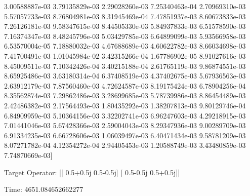 \documentclass{article}
\begin{document}
   3.00588887e-03   3.79135829e-03   2.29028260e-03   7.25340463e-04
   2.70969310e-03   5.57057733e-03   8.76804981e-03   8.31945469e-04
   7.47851937e-03   8.60673833e-03   7.26126181e-03   9.58347615e-03
   8.44505330e-03   5.84937833e-03   6.51578590e-03   7.16374347e-03
   8.48245796e-03   5.03429785e-03   6.64899099e-03   5.93566958e-03
   6.53570004e-05   7.18880032e-03   4.67688689e-03   4.60622782e-03
   8.66034698e-03   7.41700491e-03   1.01045984e-02   3.42315266e-04
   1.67786902e-05   8.91027616e-03   8.45009511e-03   7.10342426e-04
   3.40215188e-04   2.61765119e-03   9.86874551e-03   8.65925486e-03
   3.63180314e-04   6.37408519e-03   4.37402675e-03   5.67936563e-03
   2.63912179e-03   7.87560460e-03   4.72624587e-03   8.19175424e-03
   6.78904256e-04   8.35562874e-03   7.29862486e-03   3.28699685e-03
   5.78739986e-03   8.86454489e-03   2.42486382e-03   2.17564493e-03
   1.80435292e-03   1.38207813e-03   9.80129746e-04   6.84909959e-03
   5.10364156e-03   3.32202741e-03   6.96247603e-03   4.29218915e-03
   7.01441046e-03   5.67428366e-03   2.59004043e-03   8.29347936e-03
   9.00289709e-03   6.91334235e-03   6.66728606e-03   1.06039497e-03
   6.40471434e-03   9.58781209e-03   8.07271782e-04   4.12354272e-04
   2.94405453e-03   1.20588749e-03   3.43480859e-03   7.74870669e-03]

Target Operator: [[ 0.5+0.5j  0.5-0.5j]
 [ 0.5-0.5j  0.5+0.5j]]

Time: 4651.084652662277
\end{document}
